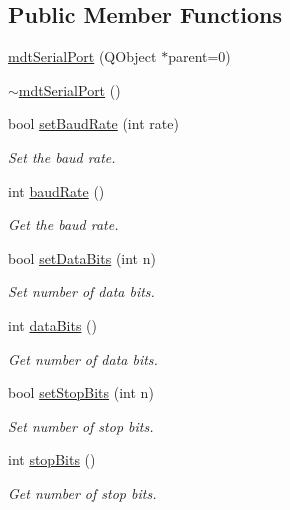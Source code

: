 \subsection*{Public Member Functions}
\begin{DoxyCompactItemize}
\item 
\hyperlink{classmdt_serial_port_a7b2da083885e727981c1fd4414634cae}{mdt\-Serial\-Port} (Q\-Object $\ast$parent=0)
\item 
\hyperlink{classmdt_serial_port_a7149994f7b5eac8a13cfe57b465e1901}{$\sim$mdt\-Serial\-Port} ()
\item 
bool \hyperlink{classmdt_serial_port_ad77b6a5fd819fae6db0db888b3113351}{set\-Baud\-Rate} (int rate)
\begin{DoxyCompactList}\small\item\em Set the baud rate. \end{DoxyCompactList}\item 
int \hyperlink{classmdt_serial_port_ab7d9433433f4ec5d5e584721e5bb1195}{baud\-Rate} ()
\begin{DoxyCompactList}\small\item\em Get the baud rate. \end{DoxyCompactList}\item 
bool \hyperlink{classmdt_serial_port_af39774b2d3c4121623253740660a0389}{set\-Data\-Bits} (int n)
\begin{DoxyCompactList}\small\item\em Set number of data bits. \end{DoxyCompactList}\item 
int \hyperlink{classmdt_serial_port_a65c92bdb5543c1fe0034169ffc88d09f}{data\-Bits} ()
\begin{DoxyCompactList}\small\item\em Get number of data bits. \end{DoxyCompactList}\item 
bool \hyperlink{classmdt_serial_port_a9471ebff90de41decee977566dd1571f}{set\-Stop\-Bits} (int n)
\begin{DoxyCompactList}\small\item\em Set number of stop bits. \end{DoxyCompactList}\item 
int \hyperlink{classmdt_serial_port_a163a83bdcac2c81a5c6b097c4afde41f}{stop\-Bits} ()
\begin{DoxyCompactList}\small\item\em Get number of stop bits. \end{DoxyCompactList}\item 

\end{DoxyCompactItemize}
